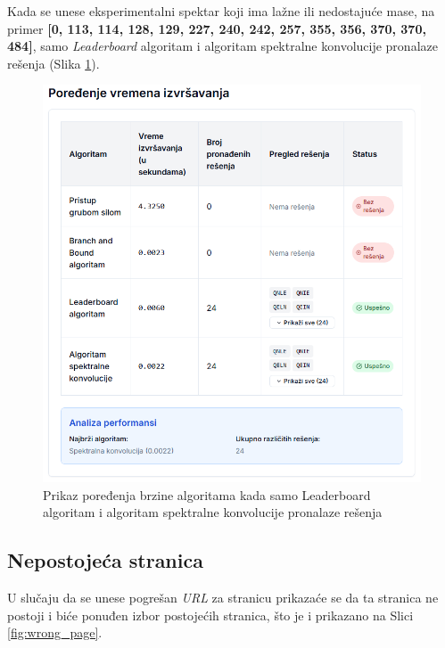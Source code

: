 \documentclass[12pt,oneside]{memoir}
\begin{document}
Kada se unese eksperimentalni spektar koji ima lažne ili nedostajuće mase, na primer \textbf{[0, 113, 114, 128, 129, 227, 240, 242, 257, 355, 356, 370, 370, 484]}, samo \emph{Leaderboard} algoritam i algoritam spektralne konvolucije pronalaze rešenja (Slika \ref{fig:comparison}).
\begin{figure}[H]
\centering
\includegraphics[width=1\textwidth]{images/comparison.png}
\caption{Prikaz poređenja brzine algoritama kada samo Leaderboard algoritam i algoritam spektralne konvolucije pronalaze rešenja}
\label{fig:comparison}
\end{figure}

\subsection{Nepostojeća stranica}

U slučaju da se unese pogrešan \emph{URL} za stranicu prikazaće se da ta stranica ne postoji i biće ponuđen izbor postojećih stranica, što je i prikazano na Slici \ref{fig:wrong_page}.
\end{document}
